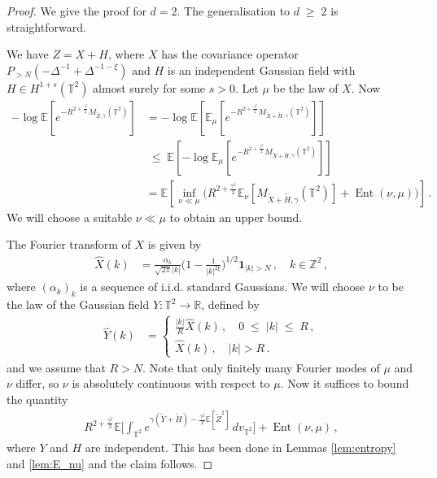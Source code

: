 \documentclass[11pt]{article}
\numberwithin{equation}{section}
\theoremstyle{definition}
\renewcommand{\tilde}{\widetilde}          %
\renewcommand{\leq}{\;\leqslant\;}                   %
\renewcommand{\geq}{\;\geqslant\;}                   %
\newcommand{\R}{\mathbb{R}}
\newcommand{\Z}{\mathbb{Z}}
\newcommand{\E}{\mathbb{E}}
\def\T{\mathbb{T}}
\newcommand{\opn}{\operatorname}
\newcommand{\PNN}{ {P_{>N}} }
\begin{document}
	\begin{proof}
	We give the proof for $d=2$. The generalisation to $d \geq 2$ is straightforward.
	
	We have $Z = X +  H$, where $X$ has the covariance operator $\PNN ( - \Delta^{-1} + \Delta^{-1-\xi})$ and $H$ is an independent Gaussian field with $H \in H^{1+s}(\T^2)$ almost surely for some $s>0$. Let $\mu$ be the law of $X$. Now
	\begin{align}\label{eq:donsker_bound}
	- \log \E [ e^{- R^{2 + \frac{\gamma^2}{2}} M_{\tilde Z,\gamma}(\T^2)} ] &= - \log  \E [ \E_{\mu} [ e^{- R^{2 + \frac{\gamma^2}{2}} M_{\tilde X+\tilde H,\gamma}(\T^2)}  ]] \nonumber \\
	& \leq \E[ -\log \E_{\mu} [e^{- R^{2 + \frac{\gamma^2}{2}} M_{\tilde X+ \tilde H,\gamma}(\T^2)}  ] ] \nonumber \\
	&= \E[ \inf_{\nu \ll \mu} \big( R^{2+\frac{\gamma^2}{2}} \E_\nu [M_{\tilde X+\tilde H,\gamma}(\T^2)] + \opn{Ent}(\nu,\mu) \big) ]\,.
	\end{align}
	We will choose a suitable $\nu \ll \mu$ to obtain an upper bound.
	
  
  
  The Fourier transform of $X$ is given by 
	\begin{align*}
	  \hat X(k) &= \frac{\alpha_k}{\sqrt{2\pi} |k|} \big( 1 - \tfrac{1}{|k|^{2\xi}} \big)^{1/2}  \mathbf{1}_{|k| >N} \,, \quad k \in \Z^2\,,
\end{align*}	  
	where $(\alpha_k)_k$ is a sequence of i.i.d. standard Gaussians. We will choose $\nu$ to be the law of the Gaussian field $Y: \T^2 \to \R$, defined by
  \begin{align}\label{eq:Y_field}
	\hat Y(k) &= \begin{cases}
	\frac{|k|}{R} \hat X(k)\,, \quad 0 \leq  |k| \leq R \,, \\
	\hat X(k) \,, \quad |k| > R \,.
	\end{cases}
  \end{align}
  and we assume that $R > N$. Note that only finitely many Fourier modes of $\mu$ and $\nu$ differ, so $\nu$ is absolutely continuous with respect to $\mu$. Now it suffices to bound the quantity
  \begin{align*}
  R^{2+ \frac{\gamma^2}{2}} \E \Big[ \int_{\T^2} e^{\gamma (\tilde Y + \tilde H) - \frac{\gamma^2}{2} \E[\tilde Z^2] } \, dv_{\T^2} \Big] + \opn{Ent}(\nu,\mu)\,,
  \end{align*}
  where $Y$ and $H$ are independent. This has been done in Lemmas \ref{lem:entropy} and \ref{lem:E_nu} and the claim follows.
	\end{proof}
	
\end{document}
